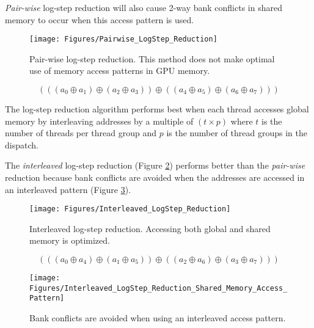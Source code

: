 \emph{Pair-wise} log-step reduction will also cause 2-way bank conflicts in shared memory to occur when this access pattern is used.

\begin{figure}[H]
\centering
\texttt{[image: Figures/Pairwise\_LogStep\_Reduction]}
\decoRule
\caption{Pair-wise log-step reduction. This method does not make optimal use of memory access patterns in GPU memory.}
\label{fig:Pairwise_LogStep_Reduction}
\end{figure}

\begin{equation}
( ( (a_0 \oplus a_1) \oplus ( a_2 \oplus a_3 ) ) \oplus ( ( a_4 \oplus a_5 ) \oplus ( a_6 \oplus a_7 ) ) )
\label{eqn:Pairwise-LogStep-Reduction}
\end{equation}

The log-step reduction algorithm performs best when each thread accesses global memory by interleaving addresses by a multiple of $(t\times p)$ where $t$ is the number of threads per thread group and $p$ is the number of thread groups in the dispatch.

The \emph{interleaved} log-step reduction (Figure \ref{fig:Interleaved_LogStep_Reduction}) performs better than the \emph{pair-wise} reduction because bank conflicts are avoided when the addresses are accessed in an interleaved pattern (Figure \ref{fig:Interleaved_LogStep_Reduction_Shared_Memory_Access_Pattern}).

\begin{figure}[H]
\centering
\texttt{[image: Figures/Interleaved\_LogStep\_Reduction]}
\decoRule
\caption{Interleaved log-step reduction. Accessing both global and shared memory is optimized.}
\label{fig:Interleaved_LogStep_Reduction}
\end{figure}

\begin{equation}
( ( (a_0 \oplus a_4) \oplus ( a_1 \oplus a_5 ) ) \oplus ( ( a_2 \oplus a_6 ) \oplus ( a_3 \oplus a_7 ) ) )
\label{eqn:Interleaved-LogStep-Reduction}
\end{equation}

\begin{figure}[h]
\centering
\texttt{[image: Figures/Interleaved\_LogStep\_Reduction\_Shared\_Memory\_Access\_Pattern]}
\decoRule
\caption{Bank conflicts are avoided when using an interleaved access pattern.}
\label{fig:Interleaved_LogStep_Reduction_Shared_Memory_Access_Pattern}
\end{figure}


